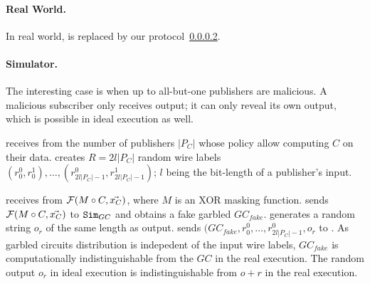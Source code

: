 \paragraph{Real World.} In real world, \F is replaced by our protocol~\ref{}.

\paragraph{Simulator.}

%
%
%
%
%
%
%

The interesting case is when up to all-but-one publishers are malicious. A
malicious subscriber only receives output; it can only reveal its own output,
which is possible in ideal execution as well.

\Sim receives from \F the number of publishers $|P_C|$ whose policy allow
computing $C$ on their data. \Sim creates $R = 2l|P_C|$ random wire labels
$(r_0^0, r_0^1), \ldots, (r_{2l|P_C|-1}^0 ,r_{2l|P_C|-1}^1)$; $l$ being the
bit-length of a publisher's input. 

\Sim receives from \F $\mathcal{F}(M \circ C, \vec{x_C})$, where $M$ is an XOR masking
function. \Sim sends $\mathcal{F}(M \circ C, \vec{x_C})$ to $\texttt{Sim}_{GC}$ and obtains a
fake garbled $GC_{fake}$. \Sim generates a random string $o_r$ of the same
length as output. \Sim sends $(GC_{fake}, r_0^0, \ldots, r_{2l|P_C|-1}^0, o_r$
to \Adv. As garbled circuits distribution is indepedent of the input wire
labels, $GC_{fake}$ is computationally indistinguishable from the $GC$ in the
real execution. The random output $o_r$ in ideal execution is indistinguishable
from $o+r$ in the real execution.

